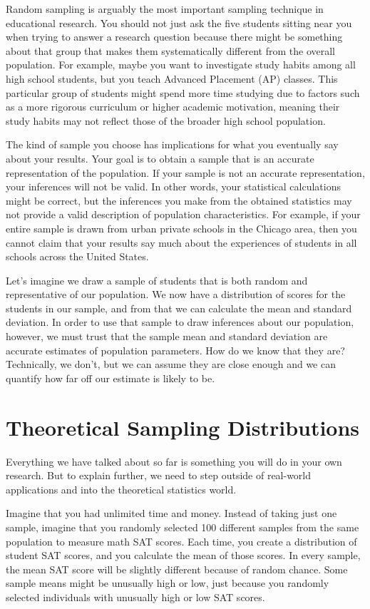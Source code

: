 \documentclass[
  letterpaper,
  DIV=11,
  numbers=noendperiod]{scrreprt}
\begin{document}
Random sampling is arguably the most important sampling technique in
educational research. You should not just ask the five students sitting
near you when trying to answer a research question because there might
be something about that group that makes them systematically different
from the overall population. For example, maybe you want to investigate
study habits among all high school students, but you teach Advanced
Placement (AP) classes. This particular group of students might spend
more time studying due to factors such as a more rigorous curriculum or
higher academic motivation, meaning their study habits may not reflect
those of the broader high school population.

The kind of sample you choose has implications for what you eventually
say about your results. Your goal is to obtain a sample that is an
accurate representation of the population. If your sample is not an
accurate representation, your inferences will not be valid. In other
words, your statistical calculations might be correct, but the
inferences you make from the obtained statistics may not provide a valid
description of population characteristics. For example, if your entire
sample is drawn from urban private schools in the Chicago area, then you
cannot claim that your results say much about the experiences of
students in all schools across the United States.

Let's imagine we draw a sample of students that is both random and
representative of our population. We now have a distribution of scores
for the students in our sample, and from that we can calculate the mean
and standard deviation. In order to use that sample to draw inferences
about our population, however, we must trust that the sample mean and
standard deviation are accurate estimates of population parameters. How
do we know that they are? Technically, we don't, but we can assume they
are close enough and we can quantify how far off our estimate is likely
to be.

\section{Theoretical Sampling
Distributions}\label{theoretical-sampling-distributions}

Everything we have talked about so far is something you will do in your
own research. But to explain further, we need to step outside of
real-world applications and into the theoretical statistics world.

Imagine that you had unlimited time and money. Instead of taking just
one sample, imagine that you randomly selected 100 different samples
from the same population to measure math SAT scores. Each time, you
create a distribution of student SAT scores, and you calculate the mean
of those scores. In every sample, the mean SAT score will be slightly
different because of random chance. Some sample means might be unusually
high or low, just because you randomly selected individuals with
unusually high or low SAT scores.
\end{document}
